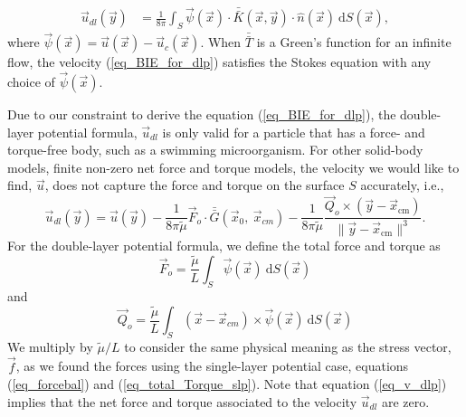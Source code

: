 \begin{align}
   \vec{u}_{dl}(\vec{y}) & =
	\frac{1}{8 \pi } \int_S  
	\vec{\psi}(\vec{x})
	\cdot  \bar{\bar{K}}(\vec{x},\vec{y})  
	\cdot \hat{n} ( \vec{x})
	\ \text{d}S(\vec{x}),
\label{eq_BIE_for_dlp}
\end{align}
where $
	\vec{\psi}(\vec{x}) =    \vec{u}(\vec{x})  - \vec{u}_c (\vec{x})$.
When $\bar{\bar{T }}$ is a Green's function for an infinite flow, the velocity (\ref{eq_BIE_for_dlp}) satisfies the Stokes equation with any choice of $\vec{\psi}(\vec{x}) $.
\par

Due to our constraint to derive the equation (\ref{eq_BIE_for_dlp}), the double-layer potential formula, $\vec{u}_{dl}$ is only valid for a particle that has a force- and torque-free body, such as a swimming microorganism.
For other solid-body models, finite non-zero net force and torque models, the velocity we would like to find, $\vec{u}$, does not capture the force and torque on the surface $S$ accurately, i.e., 
\begin{equation}
\vec{u}_{dl}(\vec{y}) = \vec{u}(\vec{y}) 
- \frac{1}{8 \pi \tilde{\mu} }\vec{F}_o \cdot \bar{\bar{G}}(\vec{x}_{0}, \ \vec{x}_{cm})
- \frac{1}{8 \pi \tilde{\mu} } \frac{\vec{Q}_o \times  (\vec{y}   - \vec{x}_{\text{cm}} ) }{\| \vec{y}   - \vec{x}_{\text{cm}} \|^3 }.
\label{eq_v_dlp}
\end{equation}
For the double-layer potential formula, we define the total force and torque as
\begin{equation}
 \vec{F}_o
  = \frac{\tilde{\mu}}{L} \int_S \vec{\psi}(\vec{x}) \  \text{d}S(\vec{x})
 \label{alpha_dl}
 \end{equation} 
 and
 \begin{equation}
 \vec{Q}_o 
 = \frac{\tilde{\mu}}{L} \int_S (\vec{x} - \vec{x}_{cm}) \times \vec{\psi}(\vec{x})  \ \text{d}S(\vec{x})
 \label{omega_dl}
 \end{equation}
%
We multiply by $\tilde{\mu} / L$ to consider the same physical meaning as the stress vector, $\vec{f}$, as we found the forces using the single-layer potential case, equations (\ref{eq_forcebal}) and (\ref{eq_total_Torque_slp}).
Note that equation (\ref{eq_v_dlp}) implies that the net force and torque associated to the velocity $\vec{u}_{dl}$ are zero.
